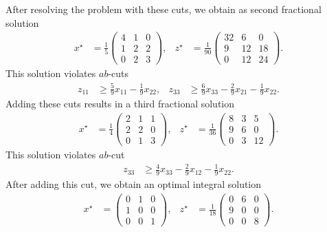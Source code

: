 \begin{example}
	After resolving the problem with these cuts, we obtain as second fractional solution
	\begin{align*}
		x^\star &= \frac{1}{5}
		\begin{pmatrix}
			4&1&0\\
			1&2&2\\
			0&2&3
		\end{pmatrix},&
		z^\star&=\frac{1}{90}
		\begin {pmatrix}
			32&6&0\\
			9&12&18\\
			0&12&24
		\end{pmatrix}.
	\end{align*}
	This solution violates $ab$-cuts
	\begin{align*}
		z_{11}&\geq \frac{5}{9}x_{11} - \frac{1}{9}x_{22},& z_{33}&\geq \frac{6}{9}x_{33} - \frac{2}{9}x_{21} - \frac{1}{9}x_{22}.
	\end{align*}	
	Adding these cuts results in a third fractional solution
	\begin{align*}
		x^\star &= \frac{1}{4}
		\begin{pmatrix}
			2&1&1\\
			2&2&0\\
			0&1&3
		\end{pmatrix},&
		z^\star&=\frac{1}{36}
		\begin {pmatrix}
			8&3&5\\
			9&6&0\\
			0&3&12
		\end{pmatrix}.
	\end{align*}
	This solution violates $ab$-cut
	\begin{align*}
		z_{33}&\geq \frac{4}{9}x_{33} - \frac{2}{9}x_{12} - \frac{1}{9}x_{22}.
	\end{align*}	
	After adding this cut, we obtain an optimal integral solution
	\begin{align*}
		x^\star &= 
		\begin{pmatrix}
			0&1&0\\
			1&0&0\\
			0&0&1
		\end{pmatrix},&
		z^\star&=\frac{1}{18}
		\begin {pmatrix}
			0&6&0\\
			9&0&0\\
			0&0&8
		\end{pmatrix}.
	\end{align*}
\end{example}

